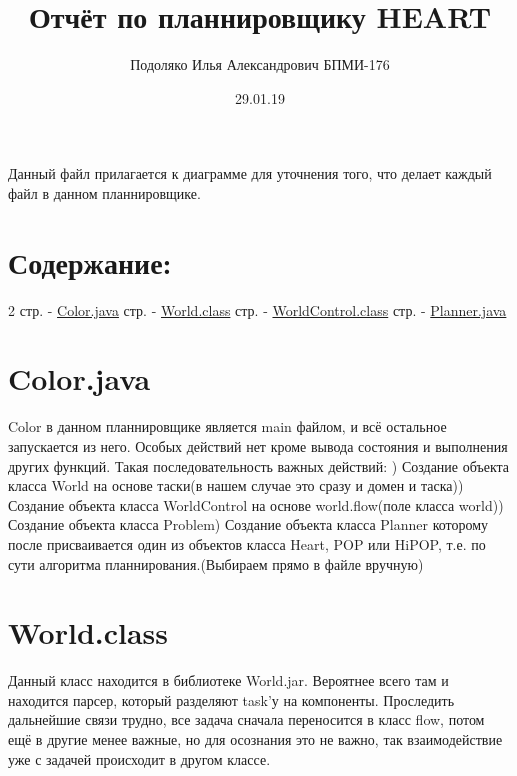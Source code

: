 \documentclass{article}
\title{Отчёт по планнировщику HEART}
\author{Подоляко Илья Александрович БПМИ-176}
\date{29.01.19}
\begin{document}
\maketitle
Данный файл прилагается к диаграмме для уточнения того, что делает каждый файл в данном планнировщике.

\section*{Содержание:}
2 стр. - \hyperlink{Color}{Color.java}  стр. - \hyperlink{World}{World.class}  стр. - \hyperlink{WorldControl}{WorldControl.class}  стр. - \hyperlink{Planner}{Planner.java}
\newpage




\section*{\hypertarget{Color}{Color.java}}
Color в данном планнировщике является main файлом, и всё остальное запускается из него. Особых действий нет кроме вывода состояния и выполнения других функций. Такая последовательность важных действий: ) Создание объекта класса World на основе таски(в нашем случае это сразу и домен и таска)) Создание объекта класса WorldControl на основе world.flow(поле класса world)) Создание объекта класса Problem) Создание объекта класса Planner которому после присваивается один из объектов класса Heart, POP или HiPOP, т.е. по сути алгоритма планнирования.(Выбираем прямо в файле вручную)\newline



\section*{\hypertarget{World}{World.class}}
Данный класс находится в библиотеке World.jar. Вероятнее всего там и находится парсер, который разделяют task'у на компоненты. Проследить дальнейшие связи трудно, все задача сначала переносится в класс flow, потом ещё в другие менее важные, но для осознания это не важно, так взаимодействие уже с задачей происходит в другом классе.
\end{document}
